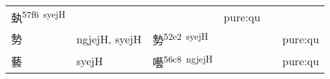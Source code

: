 \documentclass[14pt,a4paper]{scrartcl}
\begin{document}
\begin{longtable}[c]{@{}llllll@{}}
\begin{minipage}[t]{0.14\columnwidth}
埶\textsuperscript{57f6~syejH}
\strut\end{minipage} &
\begin{minipage}[t]{0.14\columnwidth}\raggedright\strut
\strut\end{minipage} &
\begin{minipage}[t]{0.14\columnwidth}\raggedright\strut
\strut\end{minipage} &
\begin{minipage}[t]{0.14\columnwidth}\raggedright\strut
pure:qu
\strut\end{minipage}\tabularnewline
\begin{minipage}[t]{0.14\columnwidth}\raggedright\strut
勢
\strut\end{minipage} &
\begin{minipage}[t]{0.14\columnwidth}\raggedright\strut
ngjejH, syejH
\strut\end{minipage} &
\begin{minipage}[t]{0.14\columnwidth}\raggedright\strut
勢\textsuperscript{52e2~syejH}
\strut\end{minipage} &
\begin{minipage}[t]{0.14\columnwidth}\raggedright\strut
\strut\end{minipage} &
\begin{minipage}[t]{0.14\columnwidth}\raggedright\strut
\strut\end{minipage} &
\begin{minipage}[t]{0.14\columnwidth}\raggedright\strut
pure:qu
\strut\end{minipage}\tabularnewline
\begin{minipage}[t]{0.14\columnwidth}\raggedright\strut
藝
\strut\end{minipage} &
\begin{minipage}[t]{0.14\columnwidth}\raggedright\strut
syejH
\strut\end{minipage} &
\begin{minipage}[t]{0.14\columnwidth}\raggedright\strut
囈\textsuperscript{56c8~ngjejH}
\strut\end{minipage} &
\begin{minipage}[t]{0.14\columnwidth}\raggedright\strut
\strut\end{minipage} &
\begin{minipage}[t]{0.14\columnwidth}\raggedright\strut
\strut\end{minipage} &
\begin{minipage}[t]{0.14\columnwidth}\raggedright\strut
pure:qu
\strut\end{minipage}\tabularnewline

\end{longtable}
\end{document}
